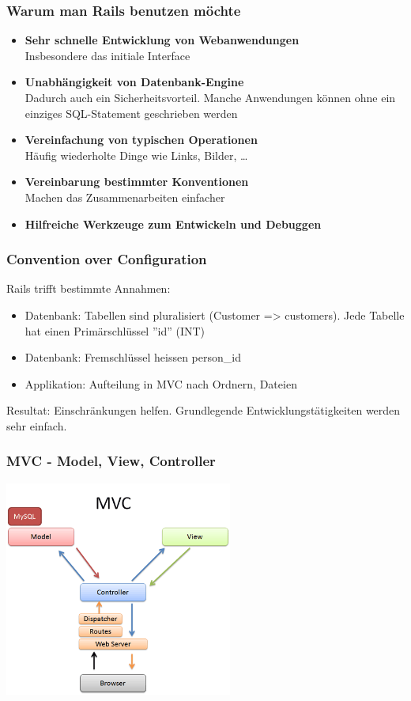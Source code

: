 \begin{frame}
  \frametitle{Warum man Rails benutzen möchte}
  \begin{itemize}
    \pause
    \item{{\bf Sehr schnelle Entwicklung von Webanwendungen} \\ Insbesondere das initiale Interface}
    \pause
    \item{{\bf Unabhängigkeit von Datenbank-Engine} \\ Dadurch auch ein Sicherheitsvorteil. Manche Anwendungen können ohne ein einziges SQL-Statement geschrieben werden}
    \pause
    \item{{\bf Vereinfachung von typischen Operationen} \\ Häufig wiederholte Dinge wie Links, Bilder, \ldots}
    \pause
    \item{{\bf Vereinbarung bestimmter Konventionen} \\ Machen das Zusammenarbeiten einfacher}
    \pause
    \item{{\bf Hilfreiche Werkzeuge zum Entwickeln und Debuggen}}
  \end{itemize}
\end{frame}

\begin{frame}
  \frametitle{Convention over Configuration}
  Rails trifft bestimmte Annahmen:
  \vspace{0.5cm}
  \begin{itemize}
    \pause
    \item Datenbank: Tabellen sind pluralisiert (Customer => customers). Jede Tabelle hat einen Primärschlüssel ''id'' (INT)
    \pause
    \item Datenbank: Fremschlüssel heissen person\_id
    \pause
    \item Applikation: Aufteilung in MVC nach Ordnern, Dateien
  \end{itemize}
  \vspace{0.5cm}
  Resultat: Einschränkungen helfen. Grundlegende Entwicklungstätigkeiten werden sehr einfach.
\end{frame}

\begin{frame}
  \frametitle{MVC - Model, View, Controller}
  \begin{center}
    \includegraphics[width=7.5cm]{img/mvc.png}
  \end{center}
\end{frame}

